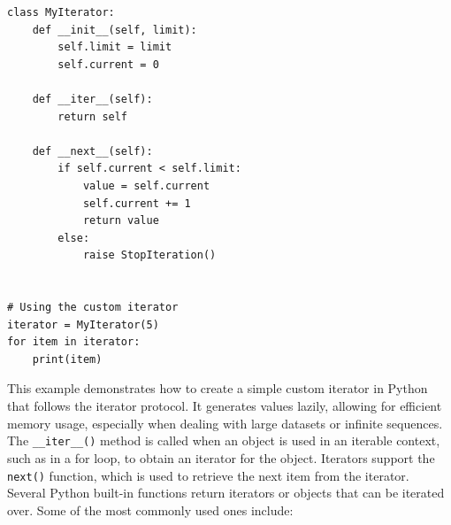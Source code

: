\begin{codebox}
\begin{verbatim}
class MyIterator:
    def __init__(self, limit):
        self.limit = limit
        self.current = 0

    def __iter__(self):
        return self

    def __next__(self):
        if self.current < self.limit:
            value = self.current
            self.current += 1
            return value
        else:
            raise StopIteration()
            

# Using the custom iterator
iterator = MyIterator(5)
for item in iterator:
    print(item)
\end{verbatim}
\end{codebox}

This example demonstrates how to create a simple custom iterator in Python that follows the iterator protocol. It generates values lazily, allowing for efficient memory usage, especially when dealing with large datasets or infinite sequences. The \texttt{\_\_iter\_\_()} method is called when an object is used in an iterable context, such as in a for loop, to obtain an iterator for the object. Iterators support the \texttt{next()} function, which is used to retrieve the next item from the iterator.\\

\newpage
Several Python built-in functions return iterators or objects that can be iterated over. Some of the most commonly used ones include:

